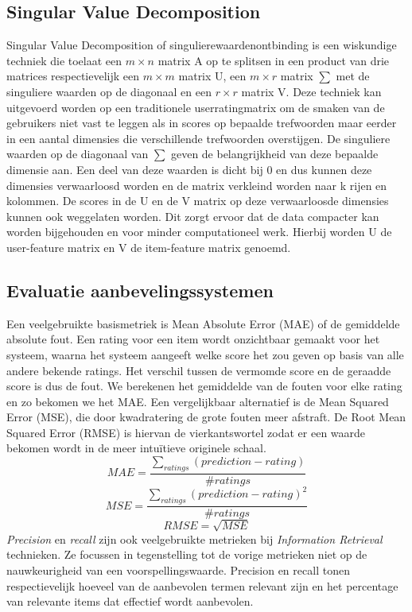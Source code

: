 \subsection{Singular Value Decomposition}
Singular Value Decomposition of singulierewaardenontbinding is een wiskundige techniek die toelaat een $m \times n$ matrix A op te splitsen in een product van drie matrices respectievelijk een $m \times m$ matrix U, een $m \times r$ matrix $\sum$ met de singuliere waarden op de diagonaal en een $r \times r$ matrix V. 
Deze techniek kan uitgevoerd worden op een traditionele userratingmatrix om de smaken van de gebruikers niet vast te leggen als in scores op bepaalde trefwoorden maar eerder in een aantal dimensies die verschillende trefwoorden overstijgen. De singuliere waarden op de diagonaal van $\sum$ geven de belangrijkheid van deze bepaalde dimensie aan. Een deel van deze waarden is dicht bij 0 en dus kunnen deze  dimensies verwaarloosd worden en de matrix verkleind worden naar k rijen en kolommen. De scores in de U en de V matrix op deze verwaarloosde dimensies kunnen ook weggelaten worden. Dit zorgt ervoor dat de data compacter kan worden bijgehouden en voor minder computationeel werk. Hierbij worden U de user-feature matrix en V de item-feature matrix genoemd. 
\subsection{Evaluatie aanbevelingssystemen}
Een veelgebruikte basismetriek is Mean Absolute Error (MAE) of de gemiddelde absolute fout. Een rating voor een item wordt onzichtbaar gemaakt voor het systeem, waarna het systeem aangeeft welke score het zou geven op basis van alle andere bekende ratings. Het verschil tussen de vermomde score en de geraadde score is dus de fout. We berekenen het gemiddelde van de fouten voor elke rating en zo bekomen we het MAE. Een vergelijkbaar alternatief is de Mean Squared Error (MSE), die door kwadratering de grote fouten meer afstraft. De Root Mean Squared Error (RMSE) is hiervan de vierkantswortel zodat er een waarde bekomen wordt in de meer intu\"itieve originele schaal.
\begin{equation}
MAE = \frac{\sum_{ratings} (prediction - rating)}{\#ratings}
\end{equation}
\begin{equation}MSE = \frac{\sum_{ratings} (prediction - rating)^2}{\#ratings}
\end{equation}
\begin{equation}
RMSE = \sqrt{MSE}
\end{equation}
\textit{Precision} en \emph{recall} zijn ook veelgebruikte metrieken bij \emph{Information Retrieval} technieken. Ze focussen in tegenstelling tot de vorige metrieken niet op de nauwkeurigheid van een voorspellingswaarde. Precision en recall tonen respectievelijk hoeveel van de aanbevolen termen relevant zijn en het percentage van relevante items dat effectief wordt aanbevolen.
